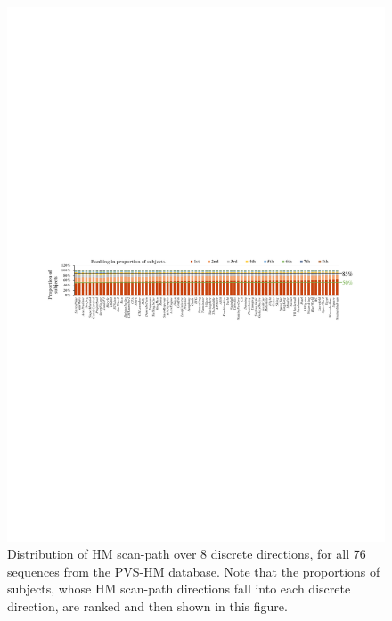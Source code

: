 \documentclass[10pt,journal,compsoc]{IEEEtran}
\begin{document}
\begin{figure}
	\begin{center}
		\centerline{\includegraphics[width=2\columnwidth]{figures/database/direction-consistence-distribution}}%
		\caption{\footnotesize{Distribution of HM scan-path over 8 discrete directions, for all 76 sequences from the PVS-HM database. Note that the proportions of subjects, whose HM scan-path directions fall into each discrete direction, are ranked and then shown in this figure.}}
		\label{direction-consistence-distribution}
	\end{center}
\end{figure}
\end{document}
